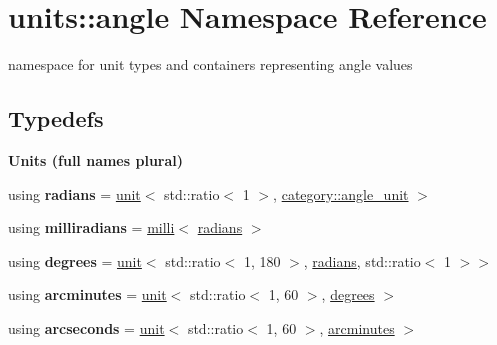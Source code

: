 \hypertarget{namespaceunits_1_1angle}{}\section{units\+:\+:angle Namespace Reference}
\label{namespaceunits_1_1angle}


namespace for unit types and containers representing angle values  


\subsection*{Typedefs}
\begin{Indent}{\bf Units (full names plural)}\par
\begin{DoxyCompactItemize}
\item 
\hypertarget{namespaceunits_1_1angle_a90954c0e37439895879f3db6ce6edf3a}{}using {\bfseries radians} = \hyperlink{structunits_1_1unit}{unit}$<$ std\+::ratio$<$ 1 $>$, \hyperlink{namespaceunits_1_1category_a7f431fefc267dd924d23fe6f3c7db3d1}{category\+::angle\+\_\+unit} $>$\label{namespaceunits_1_1angle_a90954c0e37439895879f3db6ce6edf3a}

\item 
\hypertarget{namespaceunits_1_1angle_adabe023391d06d4c1730da5d83a9ea37}{}using {\bfseries milliradians} = \hyperlink{group___unit_manipulators_gaec9d1c320e180eb59f3cb3094d8079dd}{milli}$<$ \hyperlink{structunits_1_1unit}{radians} $>$\label{namespaceunits_1_1angle_adabe023391d06d4c1730da5d83a9ea37}

\item 
\hypertarget{namespaceunits_1_1angle_a64f57548d7b49c76ccbbec7224e65aca}{}using {\bfseries degrees} = \hyperlink{structunits_1_1unit}{unit}$<$ std\+::ratio$<$ 1, 180 $>$, \hyperlink{structunits_1_1unit}{radians}, std\+::ratio$<$ 1 $>$$>$\label{namespaceunits_1_1angle_a64f57548d7b49c76ccbbec7224e65aca}

\item 
\hypertarget{namespaceunits_1_1angle_ae927b9422c7352f6177c945613e0a7e3}{}using {\bfseries arcminutes} = \hyperlink{structunits_1_1unit}{unit}$<$ std\+::ratio$<$ 1, 60 $>$, \hyperlink{structunits_1_1unit}{degrees} $>$\label{namespaceunits_1_1angle_ae927b9422c7352f6177c945613e0a7e3}

\item 
\hypertarget{namespaceunits_1_1angle_a35e7753d6eb9a0417eb901770a2af046}{}using {\bfseries arcseconds} = \hyperlink{structunits_1_1unit}{unit}$<$ std\+::ratio$<$ 1, 60 $>$, \hyperlink{structunits_1_1unit}{arcminutes} $>$\label{namespaceunits_1_1angle_a35e7753d6eb9a0417eb901770a2af046}


\end{DoxyCompactItemize}
\end{Indent}
